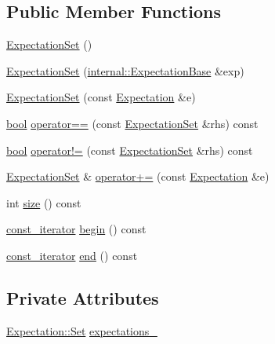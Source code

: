 \subsection*{Public Member Functions}
\begin{DoxyCompactItemize}
\item 
\hyperlink{classtesting_1_1ExpectationSet_a78cda231077b84b5c94d25a845a74374}{Expectation\+Set} ()
\item 
\hyperlink{classtesting_1_1ExpectationSet_a2448d9668e5b1a5372c97f59f1039db6}{Expectation\+Set} (\hyperlink{classtesting_1_1internal_1_1ExpectationBase}{internal\+::\+Expectation\+Base} \&exp)
\item 
\hyperlink{classtesting_1_1ExpectationSet_a2ab7f20951509d1358782093f3b7a25b}{Expectation\+Set} (const \hyperlink{classtesting_1_1Expectation}{Expectation} \&e)
\item 
\hyperlink{classbool}{bool} \hyperlink{classtesting_1_1ExpectationSet_a0c628ffa2d255f56ca09fd739d5765db}{operator==} (const \hyperlink{classtesting_1_1ExpectationSet}{Expectation\+Set} \&rhs) const
\item 
\hyperlink{classbool}{bool} \hyperlink{classtesting_1_1ExpectationSet_af7c2e68647817460c9e486cd446a9e3a}{operator!=} (const \hyperlink{classtesting_1_1ExpectationSet}{Expectation\+Set} \&rhs) const
\item 
\hyperlink{classtesting_1_1ExpectationSet}{Expectation\+Set} \& \hyperlink{classtesting_1_1ExpectationSet_a14d9f204ad4b55d56e257fc961caf756}{operator+=} (const \hyperlink{classtesting_1_1Expectation}{Expectation} \&e)
\item 
int \hyperlink{classtesting_1_1ExpectationSet_a0941a29f03582a20c5eeabb5bf095f49}{size} () const
\item 
\hyperlink{classtesting_1_1ExpectationSet_ab269a45f80d8c4f747b29de454a084bb}{const\+\_\+iterator} \hyperlink{classtesting_1_1ExpectationSet_ad7b8b900ef3f3e35a5d93aecd452504c}{begin} () const
\item 
\hyperlink{classtesting_1_1ExpectationSet_ab269a45f80d8c4f747b29de454a084bb}{const\+\_\+iterator} \hyperlink{classtesting_1_1ExpectationSet_aac2a004529006c827e4d3420c4d4187a}{end} () const
\end{DoxyCompactItemize}
\subsection*{Private Attributes}
\begin{DoxyCompactItemize}
\item 
\hyperlink{classtesting_1_1Expectation_a775955d57763c85daa8fda4b28ee2393}{Expectation\+::\+Set} \hyperlink{classtesting_1_1ExpectationSet_a3f00dd7a10f85858b12d70f4cae568c2}{expectations\+\_\+}
\end{DoxyCompactItemize}


